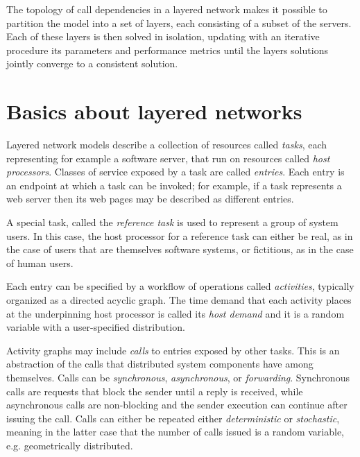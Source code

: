 The topology of call dependencies in a layered network makes it possible to partition the model into a set of layers, each consisting of a subset of the servers. Each of these layers is then solved in isolation, updating with an iterative procedure its parameters and performance metrics until the layers solutions jointly converge to a consistent solution. 

\section{Basics about layered networks}
Layered network models describe a collection of resources called \emph{tasks}, each representing for example a software server, that run on resources called \emph{host processors}. Classes of service exposed by a task are called \emph{entries}. Each entry is an endpoint at which a task can be invoked; for example, if a task represents a web server then its web pages may be described as different entries. 

A special task, called the \textit{reference task} is used to represent a group of system users. In this case, the host processor for a reference task can either be real, as in the case of users that are themselves software systems, or fictitious, as in the case of human users.

Each entry can be specified by a workflow of operations called \emph{activities}, typically organized as a directed acyclic graph. The time demand that each activity places at the underpinning host processor is called its \textit{host demand} and it is a random variable with a user-specified distribution. 

Activity graphs may include \emph{calls} to entries exposed by other tasks. This is an abstraction of the calls that distributed system components have among themselves. Calls can be \emph{synchronous}, \emph{asynchronous}, or \emph{forwarding}. Synchronous calls are requests that block the sender until a reply is received, while asynchronous calls are non-blocking and the sender execution can continue after issuing the call. Calls can either be repeated either \emph{deterministic} or \emph{stochastic}, meaning in the latter case that the number of calls issued is a random variable, e.g. geometrically distributed.

